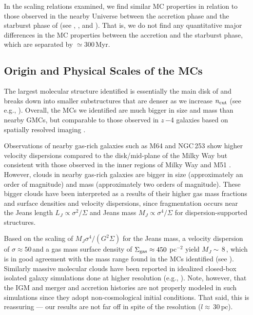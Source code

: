 \IfFileExists{emulateapjlegacy.cls}{\documentclass[iop]{emulateapjlegacy}}{\documentclass[iop]{emulateapj}}
\begin{document}
In the scaling relations examined, we find similar MC properties 
in relation to those observed in the nearby Universe between the accretion phase and the starburst phase of
\flower (see , , and ).
That is, we do not find any quantitative major differences in the MC properties between the accretion and the starburst phase, which
are separated by $\simeq$300\,Myr.

 
\subsection{Origin and Physical Scales of the MCs} \label{sec:origin} 
The largest molecular structure identified is essentially the main disk of \flower and breaks down into smaller
substructures that are denser as we increase $n_{\rm cut}$ (see e.g., ). Overall,
the MCs we identified are much bigger in size and mass than nearby GMCs, 
but comparable to those observed in $z$\,$-$4 galaxies based on spatially resolved imaging \citep{Swinbank11a}.

Observations of nearby gas-rich galaxies such as M64 and NGC\,253
show higher velocity dispersions compared
to the disk/mid-plane of the Milky Way but consistent with those observed in the inner regions of
Milky Way and M51 \citep{Oka01a, Rosolowsky05a, Heyer09a, Hughes13b, Leroy15a, Rice16a}.  %
However, clouds in nearby gas-rich galaxies are bigger in size (approximately
an order of magnitude) and mass (approximately two orders of magnitude).
These bigger clouds have been interpreted as a results of their 
higher gas mass fractions and
surface densities and velocity dispersions, since
fragmentation occurs near the Jeans length $L_J\propto\sigma^2/\Sigma$
and Jeans mass $M_J\propto\sigma^4/\Sigma$
for dispersion-supported structures.

Based on the scaling of $M_J$\eq$\sigma^4/(G^2\Sigma)$ for the Jeans mass,
a velocity dispersion of $\sigma\approx50$\,\kms and a gas mass surface density of
$\Sigma_{\rm gas}\approx450$\,\Msun\,pc$^{-2}$
yield $M_J\sim$\,8\,\Msun, which is in good agreement with the mass range found in the MCs identified (see ).
Similarly massive molecular clouds have been reported in idealized closed-box isolated galaxy
simulations done at higher resolution (e.g., \citealt{Behrendt16a}).
Note, however, that the IGM and merger and accretion histories are not properly modeled in such simulations
since they adopt non-cosmological initial conditions.
That said, this is reassuring --- our results are not far off in spite of the resolution ($l\approx$\,30\,pc).
\end{document}

